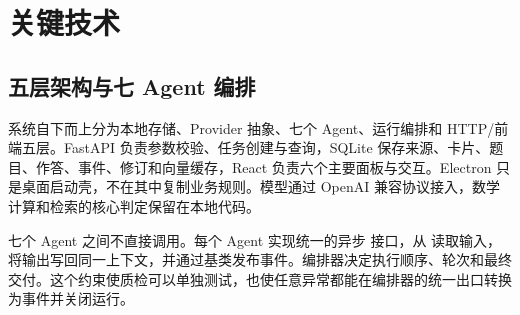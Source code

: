\section{关键技术}

\subsection{五层架构与七 Agent 编排}

系统自下而上分为本地存储、Provider 抽象、七个 Agent、运行编排和 HTTP/前端五层。FastAPI 负责参数校验、任务创建与查询，SQLite 保存来源、卡片、题目、作答、事件、修订和向量缓存，React 负责六个主要面板与交互。Electron 只是桌面启动壳，不在其中复制业务规则。模型通过 OpenAI 兼容协议接入，数学计算和检索的核心判定保留在本地代码。

七个 Agent 之间不直接调用。每个 Agent 实现统一的异步  接口，从  读取输入，将输出写回同一上下文，并通过基类发布事件。编排器决定执行顺序、轮次和最终交付。这个约束使质检可以单独测试，也使任意异常都能在编排器的统一出口转换为事件并关闭运行。

